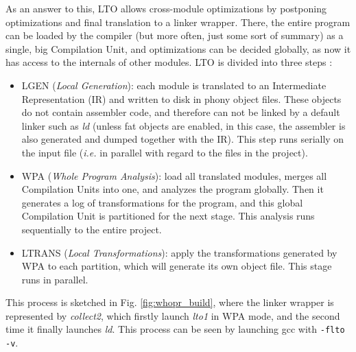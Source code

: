 \documentclass[runningheads]{llncs}
\begin{document}
As an answer to this, LTO allows cross-module optimizations by
postponing optimizations and final translation to a linker wrapper. There, the entire
program can be loaded by the compiler (but more often, just some sort of summary)
as a single, big Compilation Unit, and optimizations can be decided globally,
as now it has access to the internals of other modules. LTO is divided into
three steps \cite{whoprgoogle,glek2010optimizing}:
\begin{itemize}
\item LGEN (\textit{Local Generation}): each module is translated to an Intermediate
Representation (IR) and written to disk in phony object files. These objects do
not contain assembler code, and therefore can not be linked by a default linker
such as \textit{ld} (unless fat objects are enabled, in this case, the assembler is also
generated and dumped together with the IR). This step runs serially
on the input file (\textit{i.e.} in parallel with regard to the files in the project).

\item WPA (\textit{Whole Program Analysis}): load all translated modules, merges
all Compilation Units into one, and analyzes the program globally.
Then it generates a log of transformations for the program, and this global
Compilation Unit is partitioned for the next stage. This analysis runs sequentially
to the entire project.

\item LTRANS (\textit{Local Transformations}): apply the transformations generated by
WPA to each partition, which will generate its own object file. This stage runs in
parallel.
\end{itemize}

This process is sketched in Fig. \ref{fig:whopr_build}, where the linker
wrapper is represented by \textit{collect2}, which firstly launch \textit{lto1}
in WPA mode, and the second time it finally launches \textit{ld}. This process
can be seen by launching gcc with \texttt{-flto -v}.
\end{document}
